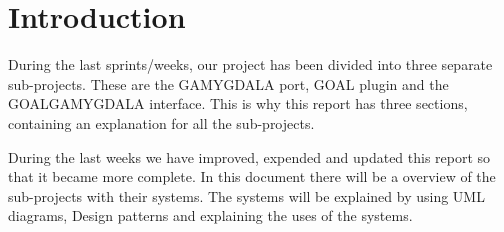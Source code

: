 \section{Introduction} 
During the last sprints/weeks, our project has been divided into three separate sub-projects. These are the GAMYGDALA port, GOAL plugin and the GOALGAMYGDALA interface. This is why this report has three sections, containing an explanation for all the sub-projects. \\ \par
During the last weeks we have improved, expended and updated this report so that it became more complete. In this document there will be a overview of the sub-projects with their systems. The systems will be explained by using UML diagrams, Design patterns and explaining the uses of the systems.